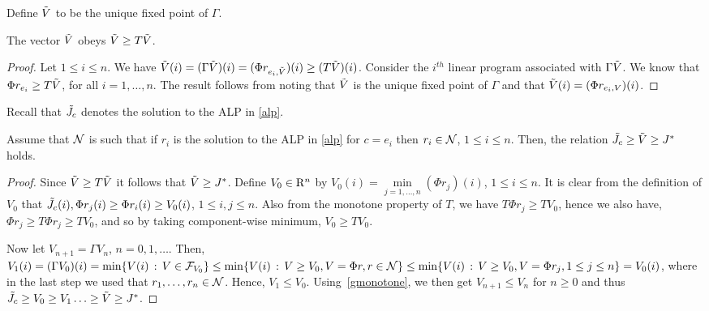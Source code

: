 \fi
Define $\tilde{V}$ to be the unique fixed point of $\Gamma$.
\begin{lemma}\label{gfp}
The vector $\tilde{V}$ obeys $\tilde{V}\geq T\tilde{V}$.
\end{lemma}
\begin{proof}
Let $1\le i \le n$. We have $\tilde{V}(i) = (\Gamma \tilde{V})(i) = (\Phi r_{e_i,\tilde{V}})(i) \ge (T\tilde{V})(i)$.
Consider the $i^{th}$ linear program associated with $\Gamma \tilde{V}$. We know that $\Phi r_{e_i}\geq T \tilde{V}$, for all $i=1,\ldots, n$. The result follows from noting that $\tilde{V}$ is the unique fixed point of $\Gamma $ and that $\tilde{V}(i)=(\Phi r_{e_i,V})(i)$.
\fi
\end{proof}
Recall that $\tilde{J}_c$ denotes the solution to the ALP in \eqref{alp}.
\begin{lemma}\label{relation1}
Assume that $\mathcal{N}$ is such that if $r_i$ is
the solution to the ALP in \eqref{alp} for $c=e_i$ then $r_i\in \mathcal{N}$, $1\le i \le n$.
Then, the relation $\tilde{J}_c\geq\tilde{V}\geq J^*$ holds.
\end{lemma}
\begin{proof}
Since $\tilde{V}\geq T\tilde{V}$ it follows that $\tilde{V}\geq J^*$. 
Define $V_0\in \mathrm{R}^n$ by $V_0(i)=\underset{j=1,\ldots, n}{\min}(\Phi r_j)(i)$, $1\le i \le n$. 
It is clear from the definition of $V_0$ that $\tilde{J}_c(i), \Phi r_j(i) \geq\Phi r_i(i)\geq V_0(i)$, $1\le i,j \le n$. 
Also from the monotone property of $T$, we have $T\Phi r_j\geq T V_0$,
hence we also have,
$\Phi r_j\geq T\Phi r_j \geq T V_0$, 
and so by taking component-wise minimum,
$V_0 \geq T V_0$.

Now let $V_{n+1} = \Gamma V_n$, $n=0,1,\dots$. Then, $V_1(i) = (\Gamma V_0)(i) = \min\{ V(i) \,:\, V\in \mathcal{F}_{V_0} \}
\le \min\{ V(i) \,:\, V\ge V_0, V = \Phi r, r\in \mathcal{N} \} \le \min\{ V(i)\,:\, V \ge V_0, V = \Phi r_j, 1\le j \le n \} = V_0(i)$,
where in the last step we used that $r_1,\dots,r_n \in \mathcal{N}$.
Hence, $V_1 \le V_0$. Using~\cref{gmonotone}, we then get $V_{n+1}\le V_n$ for $n\ge 0$ and thus 
$\tilde{J}_c\geq V_0\geq V_1\ldots\geq \tilde{V} \geq J^*$.
\end{proof}

